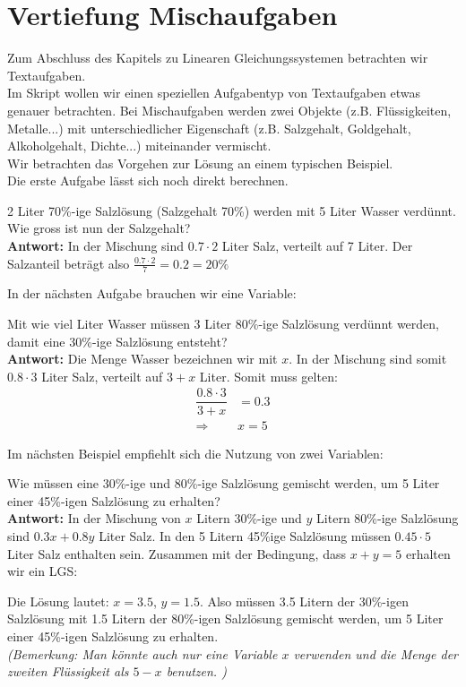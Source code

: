 \documentclass[11pt,oneside]{article}
\begin{document}
\section*{Vertiefung Mischaufgaben}
	Zum Abschluss des Kapitels zu Linearen Gleichungssystemen betrachten wir Textaufgaben.\\
	Im Skript wollen wir einen speziellen Aufgabentyp von Textaufgaben etwas genauer betrachten. Bei Mischaufgaben werden zwei Objekte (z.B. Flüssigkeiten, Metalle...)  mit unterschiedlicher Eigenschaft (z.B. Salzgehalt, Goldgehalt, Alkoholgehalt, Dichte...) miteinander vermischt.
	\\
	Wir betrachten das Vorgehen zur Lösung an einem typischen Beispiel.\\
	Die erste Aufgabe lässt sich noch direkt berechnen.
	\begin{beispiel}
		2 Liter 70\%-ige Salzlösung (Salzgehalt 70\%) werden mit 5 Liter Wasser verdünnt. Wie gross ist nun der Salzgehalt?\\
		\textbf{Antwort: } In der Mischung sind $0.7\cdot 2$ Liter Salz, verteilt auf 7 Liter.
		Der Salzanteil beträgt also $\frac{0.7\cdot 2}{7}=0.2=20\%$
	\end{beispiel}
	\noindent
	In der nächsten Aufgabe brauchen wir eine Variable:
	\begin{beispiel}
		Mit wie viel Liter Wasser müssen 3 Liter 80\%-ige Salzlösung verdünnt werden, damit eine 30\%-ige Salzlösung entsteht?\\
		\textbf{Antwort: } Die Menge Wasser bezeichnen wir mit $x$. In der Mischung sind somit $0.8\cdot 3$ Liter Salz, verteilt auf $3+x$ Liter. Somit muss gelten:
		\begin{align*}
			\dfrac{0.8\cdot 3}{3+x}&=0.3 \\
			\Rightarrow& x=5
		\end{align*}
	\end{beispiel}
	\noindent
	Im nächsten Beispiel empfiehlt sich die Nutzung von zwei Variablen:
	\begin{beispiel}
		Wie müssen eine 30\%-ige und 80\%-ige Salzlösung gemischt werden, um 5 Liter einer 45\%-igen Salzlösung zu erhalten?\\
		\textbf{Antwort: } In der Mischung von $x$ Litern 30\%-ige und $y$ Litern 80\%-ige Salzlösung sind $0.3x+0.8y$ Liter Salz. In den 5 Litern 45\%ige Salzlösung müssen $0.45\cdot 5$ Liter Salz enthalten sein. Zusammen mit der Bedingung, dass $x+y=5$ erhalten wir ein LGS:
		\begin{center}
		\end{center}
		Die Lösung lautet: $x=3.5$, $y=1.5$. Also müssen 3.5 Litern der 30\%-igen Salzlösung mit 1.5 Litern der 80\%-igen Salzlösung gemischt werden, um 5 Liter einer 45\%-igen Salzlösung zu erhalten.\\
		\emph{(Bemerkung: Man könnte auch nur eine Variable $x$ verwenden und die Menge der zweiten Flüssigkeit als $5-x$ benutzen. )}
	\end{beispiel}
\end{document}
